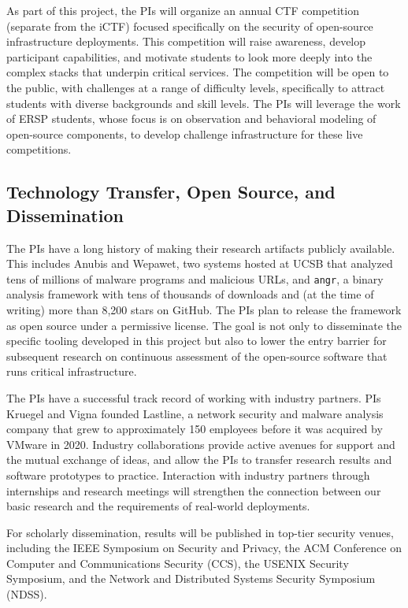 As part of this project, the PIs will organize an annual CTF
competition (separate from the iCTF) focused specifically on the
security of open-source infrastructure deployments. This competition
will raise awareness, develop participant capabilities, and motivate
students to look more deeply into the complex stacks that underpin
critical services. The competition will be open to the public,
with challenges at a range of difficulty levels, specifically to
attract students with diverse backgrounds and skill levels. The PIs
will leverage the work of ERSP students, whose focus is on observation
and behavioral modeling of open-source components, to develop
challenge infrastructure for these live competitions.

\subsection{Technology Transfer, Open Source, and Dissemination}

The PIs have a long history of making their research artifacts publicly
available. This includes Anubis and Wepawet, two systems hosted at
UCSB that analyzed tens of millions of malware programs and malicious
URLs, and \texttt{angr}, a binary analysis framework with tens of
thousands of downloads and (at the time of writing) more than 8{,}200
stars on GitHub. The PIs plan to release the \sysname framework as
open source under a permissive license. The goal is not only to
disseminate the specific tooling developed in this project but also to
lower the entry barrier for subsequent research on continuous
assessment of the open-source software that runs critical
infrastructure.

The PIs have a successful track record of working with industry
partners. PIs Kruegel and Vigna founded Lastline, a network security
and malware analysis company that grew to approximately 150 employees
before it was acquired by VMware in 2020. Industry collaborations
provide active avenues for support and the mutual exchange of ideas,
and allow the PIs to transfer research results and software prototypes
to practice. Interaction with industry partners through internships
and research meetings will strengthen the connection between our
basic research and the requirements of real-world deployments.

For scholarly dissemination, results will be published in top-tier
security venues, including the IEEE Symposium on Security and Privacy,
the ACM Conference on Computer and Communications Security (CCS), the
USENIX Security Symposium, and the Network and Distributed Systems
Security Symposium (NDSS).
